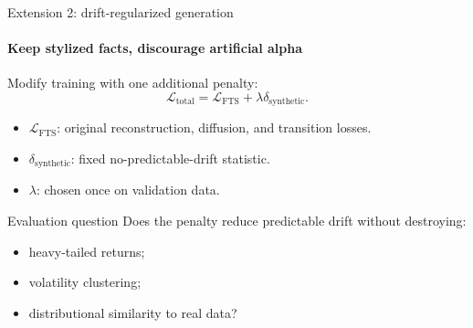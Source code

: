 \begin{frame}{Extension 2: drift-regularized generation}
\framesubtitle{Keep stylized facts, discourage artificial alpha}

Modify training with one additional penalty:
\[
\mathcal{L}_{\text{total}}
=
\mathcal{L}_{\text{FTS}}
+
\lambda
\delta_{\text{synthetic}} .
\]

\begin{itemize}
\item \(\mathcal{L}_{\text{FTS}}\): original reconstruction, diffusion, and transition losses.
\item \(\delta_{\text{synthetic}}\): fixed no-predictable-drift statistic.
\item \(\lambda\): chosen once on validation data.
\end{itemize}

\medskip

\begin{block}{Evaluation question}
Does the penalty reduce predictable drift without destroying:
\begin{itemize}
\item heavy-tailed returns;
\item volatility clustering;
\item distributional similarity to real data?
\end{itemize}
\end{block}

\end{frame}


